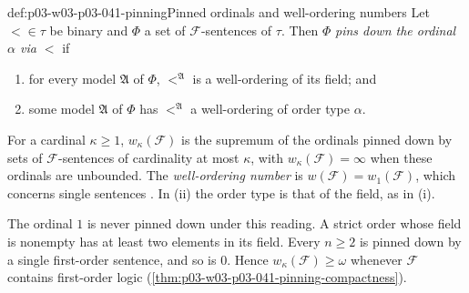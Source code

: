 \begin{hbdefinition}{def:p03-w03-p03-041-pinning}{Pinned ordinals and well-ordering numbers}
Let \(<\in\tau\) be binary and \(\Phi\) a set of \(\mathcal F\)-sentences
of \(\tau\). Then \(\Phi\) \emph{pins down the ordinal \(\alpha\) via
\(<\)} if
\begin{enumerate}
\item[(i)] for every model \(\mathfrak A\) of \(\Phi\), \(<^{\mathfrak A}\)
      is a well-ordering of its field; and
\item[(ii)] some model \(\mathfrak A\) of \(\Phi\) has \(<^{\mathfrak A}\)
      a well-ordering of order type \(\alpha\).
\end{enumerate}
For a cardinal \(\kappa\geq1\), \(w_\kappa(\mathcal F)\) is the supremum
of the ordinals pinned down by sets of \(\mathcal F\)-sentences of
cardinality at most \(\kappa\), with \(w_\kappa(\mathcal F)=\infty\) when
these ordinals are unbounded. The \emph{well-ordering number} is
\(w(\mathcal F)=w_1(\mathcal F)\), which concerns single sentences
\cite[Ch.~II, Definition~5.2.1, pp.~60--61]{Ebbinghaus1985ExtendedLogics}.
In (ii) the order type is that of the field, as in (i).
\end{hbdefinition}

The ordinal \(1\) is never pinned down under this reading. A strict order
whose field is nonempty has at least two elements in its field. Every
\(n\geq2\) is pinned down by a single first-order sentence, and so is
\(0\). Hence \(w_\kappa(\mathcal F)\geq\omega\) whenever \(\mathcal F\)
contains first-order logic (\cref{thm:p03-w03-p03-041-pinning-compactness}).

